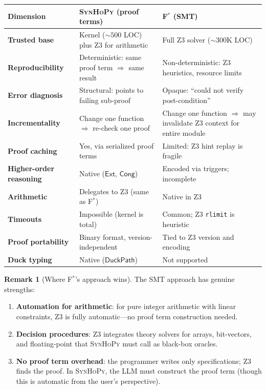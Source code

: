 \documentclass[11pt,a4paper]{report}
\theoremstyle{definition}
\newtheorem{remark}[definition]{Remark}
\theoremstyle{plain}
\newcommand{\Ext}{\mathsf{Ext}}
\newcommand{\Cong}{\mathsf{Cong}}
\newcommand{\fstar}{F$^{*}$}
\newcommand{\synhopy}{\textsc{SynHoPy}}
\begin{document}
\begin{center}
\begin{tabular}{lp{5cm}p{5cm}}
  \toprule
  \textbf{Dimension} & \textbf{\synhopy{} (proof terms)}
    & \textbf{\fstar{} (SMT)} \\
  \midrule
  \textbf{Trusted base} &
    Kernel (${\sim}500$ LOC) plus Z3 for arithmetic &
    Full Z3 solver (${\sim}300$K LOC) \\
  \textbf{Reproducibility} &
    Deterministic: same proof term $\Rightarrow$ same result &
    Non-deterministic: Z3 heuristics, resource limits \\
  \textbf{Error diagnosis} &
    Structural: points to failing sub-proof &
    Opaque: ``could not verify post-condition'' \\
  \textbf{Incrementality} &
    Change one function $\Rightarrow$ re-check one proof &
    Change one function $\Rightarrow$ may invalidate
    Z3 context for entire module \\
  \textbf{Proof caching} &
    Yes, via serialized proof terms &
    Limited: Z3 hint replay is fragile \\
  \textbf{Higher-order reasoning} &
    Native ($\Ext$, $\Cong$) &
    Encoded via triggers; incomplete \\
  \textbf{Arithmetic} &
    Delegates to Z3 (same as \fstar{}) &
    Native in Z3 \\
  \textbf{Timeouts} &
    Impossible (kernel is total) &
    Common; Z3 \texttt{rlimit} is heuristic \\
  \textbf{Proof portability} &
    Binary format, version-independent &
    Tied to Z3 version and encoding \\
  \textbf{Duck typing} &
    Native ($\mathsf{DuckPath}$) &
    Not supported \\
  \bottomrule
\end{tabular}
\end{center}

\begin{remark}[Where \fstar{}'s approach wins]
The SMT approach has genuine strengths:
\begin{enumerate}
  \item \textbf{Automation for arithmetic}: for pure integer arithmetic
    with linear constraints, Z3 is fully automatic---no proof term
    construction needed.
  \item \textbf{Decision procedures}: Z3 integrates theory solvers for
    arrays, bit-vectors, and floating-point that \synhopy{} must
    call as black-box oracles.
  \item \textbf{No proof term overhead}: the programmer writes only
    specifications; Z3 finds the proof. In \synhopy{}, the LLM must
    construct the proof term (though this is automatic from the user's
    perspective).
\end{enumerate}
\end{remark}
\end{document}
